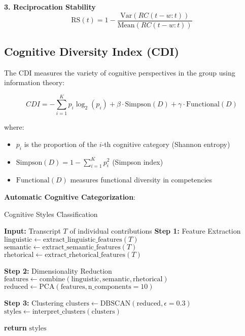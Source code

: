 \textbf{3. Reciprocation Stability}
\begin{equation}
	\text{RS}(t) = 1 - \frac{\text{Var}(RC(t-w:t))}{\text{Mean}(RC(t-w:t))}
	\label{eq:reciprocation-stability}
\end{equation}

\subsection{Cognitive Diversity Index (CDI)}

The CDI measures the variety of cognitive perspectives in the group using information theory:

\begin{equation}
	CDI = -\sum_{i=1}^{K} p_i \log_2(p_i) + \beta \cdot \text{Simpson}(D) + \gamma \cdot \text{Functional}(D)
	\label{eq:cognitive-diversity}
\end{equation}

where:
\begin{itemize}
	\item $p_i$ is the proportion of the $i$-th cognitive category (Shannon entropy)
	\item $\text{Simpson}(D) = 1 - \sum_{i=1}^{K} p_i^2$ (Simpson index)
	\item $\text{Functional}(D)$ measures functional diversity in competencies
\end{itemize}

\textbf{Automatic Cognitive Categorization}:

\begin{algorithm}[H]
	\caption{Cognitive Styles Classification}
	\label{alg:cognitive-classification}
	\begin{algorithmic}[1]
		\State \textbf{Input:} Transcript $T$ of individual contributions
		\State \textbf{Step 1:} Feature Extraction
		\State $\text{linguistic} \gets \text{extract\_linguistic\_features}(T)$ 
		\State $\text{semantic} \gets \text{extract\_semantic\_features}(T)$ 
		\State $\text{rhetorical} \gets \text{extract\_rhetorical\_features}(T)$ 
		
		\State \textbf{Step 2:} Dimensionality Reduction
		\State $\text{features} \gets \text{combine}(\text{linguistic}, \text{semantic}, \text{rhetorical})$
		\State $\text{reduced} \gets \text{PCA}(\text{features}, \text{n\_components}=10)$
		
		\State \textbf{Step 3:} Clustering
		\State $\text{clusters} \gets \text{DBSCAN}(\text{reduced}, \epsilon=0.3)$
		\State $\text{styles} \gets \text{interpret\_clusters}(\text{clusters})$ 
		
		\State \textbf{return} $\text{styles}$ 
	\end{algorithmic}
\end{algorithm}

